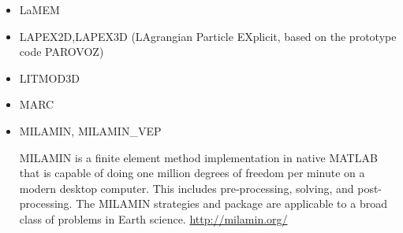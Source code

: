 \begin{itemize}
\item LaMEM 

{\small
\noindent
\cite{scbe08}
\cite{kamm10}
\cite{lemk11}
\cite{may12}
\cite{lesh14}\cite{cokm14}\cite{bakp14}\cite{feka14a}\cite{feka14b}
\cite{puka15}\cite{feka15}\cite{cofk15}
\cite{kapb16}\cite{coyc16}
\cite{pukp18}
\cite{eitp19}
}

\item LAPEX2D,LAPEX3D  (LAgrangian Particle EXplicit, based on the prototype code PAROVOZ) 

{\small
\noindent
\cite{sopg05}\cite{baso05}\cite{soba05}
\cite{bbeg06}\cite{basv06}
\cite{peso06}\cite{peso08}
\cite{baso08}
\cite{scbe08}
\cite{sosk11}
}

\item LITMOD3D

{\small 
\noindent
\cite{afrf07}
\cite{affr08}
\cite{fuac09}
\cite{fufa10}
}

\item MARC

{\small
\noindent
\cite{nesg97}
\cite{nesb99}
}


\item {\codefont MILAMIN, MILAMIN\_VEP} 

MILAMIN is a finite element method implementation in native MATLAB that is capable of doing one million degrees of freedom per minute on a modern desktop computer. This includes pre-processing, solving, and post-processing. The MILAMIN strategies and package are applicable to a broad class of problems in Earth science. \url{http://milamin.org/}


\end{itemize}
